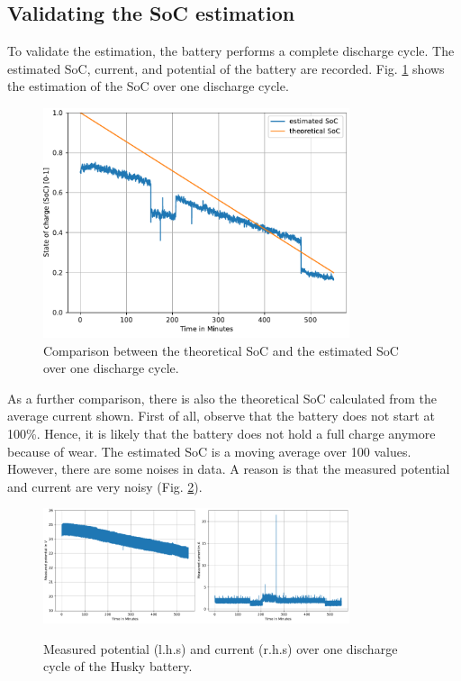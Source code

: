 \documentclass[conference]{IEEEtran}
\begin{document}
\subsection{Validating the SoC estimation}
To validate the estimation, the battery  performs a complete discharge cycle. The  estimated SoC,  current, and  potential of the battery are recorded.
Fig. \ref{fig:SoCUeberZeit} shows the estimation of the SoC over one discharge cycle.
\begin{figure}[htbp]
    \centerline{\includegraphics[width=9cm]{Pictures/SoCUeberZeit.pdf}}
    \caption{Comparison between the theoretical SoC and the estimated SoC over one discharge cycle.}
    \label{fig:SoCUeberZeit}
\end{figure}
As a further comparison, there is also the theoretical SoC calculated from the average current shown.
First of all, observe that the battery does not start at 100\%. Hence, it is likely that the battery does not hold a full charge anymore because of wear. The estimated SoC is a moving average over 100 values. However, there are some noises in  data.
A reason is that the measured potential and current are very noisy (Fig. \ref{fig:SpannungStromUeberZeit}).
\begin{figure}[htbp]
    \centerline{\includegraphics[width=4.5cm]{Pictures/SpannungUeberZeit.pdf}\includegraphics[width=4.5cm]{Pictures/StormUeberZeit.pdf}}
    \caption{Measured potential (l.h.s) and current (r.h.s) over one discharge cycle of the Husky battery.}
    \label{fig:SpannungStromUeberZeit}
\end{figure}
\end{document}
